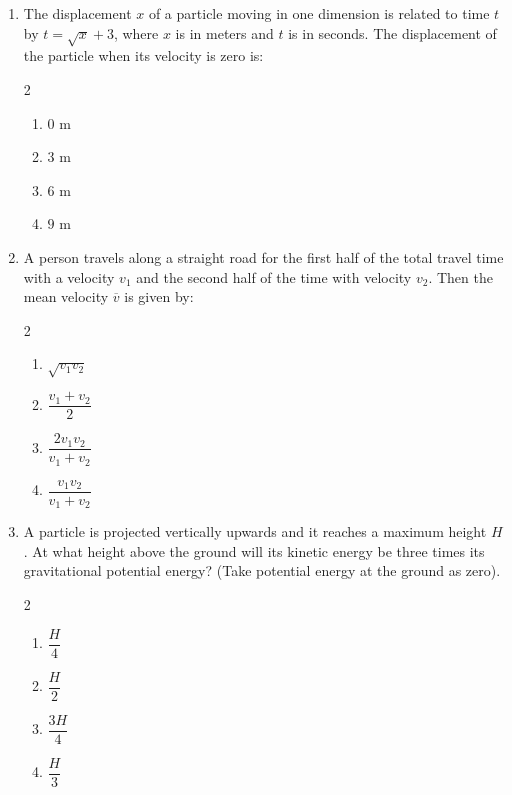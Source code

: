 \documentclass[11pt,a4paper]{article}
\begin{document}
\begin{enumerate}[label=\textbf{\textcolor{l1Green}{Q\arabic*.}},leftmargin=24pt,itemsep=10pt]
  \item The displacement $x$ of a particle moving in one dimension is related to time $t$ by $t = \sqrt{x} + 3$, where $x$ is in meters and $t$ is in seconds. The displacement of the particle when its velocity is zero is:
  \begin{multicols}{2}
  \begin{enumerate}[label=\textbf{\textcolor{primaryDark}{(\Alph*)}},itemsep=2pt]
    \item $0\text{ m}$
    \item $3\text{ m}$
    \item $6\text{ m}$
    \item $9\text{ m}$
  \end{enumerate}
  \end{multicols}

  \item A person travels along a straight road for the first half of the total travel time with a velocity $v_1$ and the second half of the time with velocity $v_2$. Then the mean velocity $\overline{v}$ is given by:
  \begin{multicols}{2}
  \begin{enumerate}[label=\textbf{\textcolor{primaryDark}{(\Alph*)}},itemsep=2pt]
    \item $\sqrt{v_1 v_2}$
    \item $\dfrac{v_1 + v_2}{2}$
    \item $\dfrac{2 v_1 v_2}{v_1 + v_2}$
    \item $\dfrac{v_1 v_2}{v_1 + v_2}$
  \end{enumerate}
  \end{multicols}

  \item A particle is projected vertically upwards and it reaches a maximum height $H$. At what height above the ground will its kinetic energy be three times its gravitational potential energy? (Take potential energy at the ground as zero).
  \begin{multicols}{2}
  \begin{enumerate}[label=\textbf{\textcolor{primaryDark}{(\Alph*)}},itemsep=2pt]
    \item $\dfrac{H}{4}$
    \item $\dfrac{H}{2}$
    \item $\dfrac{3H}{4}$
    \item $\dfrac{H}{3}$
  \end{enumerate}
  \end{multicols}


\end{enumerate}
\end{document}
